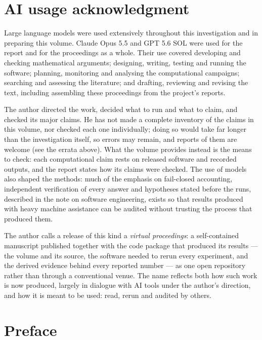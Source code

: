 \chapter*{AI usage acknowledgment}

Large language models were used extensively throughout this investigation and in preparing this
volume. Claude Opus 5.5 and GPT 5.6 SOL were used for the report and for the proceedings as a
whole. Their use covered developing and checking mathematical arguments; designing, writing,
testing and running the software; planning, monitoring and analysing the computational campaigns;
searching and assessing the literature; and drafting, reviewing and revising the text, including
assembling these proceedings from the project's reports.

The author directed the work, decided what to run and what to claim, and checked its major
claims. He has not made a complete inventory of the claims in this volume, nor checked each one
individually; doing so would take far longer than the investigation itself, so errors may remain,
and reports of them are welcome (see the errata above). What the volume provides instead is the
means to check: each computational claim rests on released software and recorded outputs, and the
report states how its claims were checked. The use of models also shaped the methods: much of the
emphasis on fail-closed accounting, independent verification of every answer and hypotheses stated
before the runs, described in the note on software engineering, exists so that results produced with heavy machine assistance can be audited without
trusting the process that produced them.

The author calls a release of this kind a \emph{virtual proceedings}: a self-contained manuscript
published together with the code package that produced its results --- the volume and its source,
the software needed to rerun every experiment, and the derived evidence behind every reported
number --- as one open repository rather than through a conventional venue. The name reflects both
how such work is now produced, largely in dialogue with AI tools under the author's direction, and
how it is meant to be used: read, rerun and audited by others.

\chapter*{Preface}


